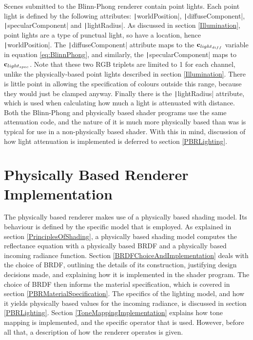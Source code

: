 Scenes submitted to the Blinn-Phong renderer contain point lights. Each point light is defined by the following attributes: \texttt|worldPosition|, \texttt|diffuseComponent|, \texttt|specularComponent| and \texttt|lightRadius|. As discussed in section \ref{Illumination}, point lights are a type of punctual light, so have a location, hence \texttt|worldPosition|. The \texttt|diffuseComponent| attribute maps to the \begin{math}\mathbf{c}_{light_{diff}}\end{math} variable in equation \ref{eq:BlinnPhong}, and similarly, the \texttt|specularComponent| maps to \begin{math}\mathbf{c}_{light_{spec}}\end{math}. Note that these two RGB triplets are limited to 1 for each channel, unlike the physically-based point lights described in section \ref{Illumination}. There is little point in allowing the specification of colours outside this range, because they would just be clamped anyway. Finally there is the \texttt|lightRadius| attribute, which is used when calculating how much a light is attenuated with distance. Both the Blinn-Phong and physically based shader programs use the same attenuation code, and the nature of it is much more physically based than was is typical for use in a non-physically based shader. With this in mind, discussion of how light attenuation is implemented is deferred to section \ref{PBRLighting}.

\section{Physically Based Renderer Implementation} \label{PBRImplementation}

The physically based renderer makes use of a physically based shading model. Its behaviour is defined by the specific model that is employed. As explained in section \ref{PrinciplesOfShading}, a physically based shading model computes the reflectance equation with a physically based BRDF and a physically based incoming radiance function. Section \ref{BRDFChoiceAndImplementation} deals with the choice of BRDF, outlining the details of its construction, justifying design decisions made, and explaining how it is implemented in the shader program. The choice of BRDF then informs the material specification, which is covered in section \ref{PBRMaterialSpecification}. The specifics of the lighting model, and how it yields physically based values for the incoming radiance, is discussed in section \ref{PBRLighting}. Section \ref{ToneMappingImplementation} explains how tone mapping is implemented, and the specific operator that is used. However, before all that, a description of how the renderer operates is given.

